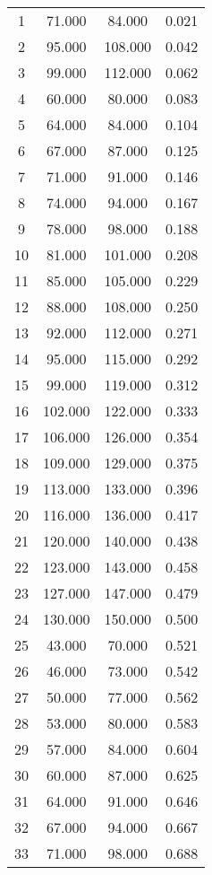 % 
\begin{tabular}{cccc}
  \hline
  \hline
1 & 71.000 & 84.000 & 0.021 \\ 
  2 & 95.000 & 108.000 & 0.042 \\ 
  3 & 99.000 & 112.000 & 0.062 \\ 
  4 & 60.000 & 80.000 & 0.083 \\ 
  5 & 64.000 & 84.000 & 0.104 \\ 
  6 & 67.000 & 87.000 & 0.125 \\ 
  7 & 71.000 & 91.000 & 0.146 \\ 
  8 & 74.000 & 94.000 & 0.167 \\ 
  9 & 78.000 & 98.000 & 0.188 \\ 
  10 & 81.000 & 101.000 & 0.208 \\ 
  11 & 85.000 & 105.000 & 0.229 \\ 
  12 & 88.000 & 108.000 & 0.250 \\ 
  13 & 92.000 & 112.000 & 0.271 \\ 
  14 & 95.000 & 115.000 & 0.292 \\ 
  15 & 99.000 & 119.000 & 0.312 \\ 
  16 & 102.000 & 122.000 & 0.333 \\ 
  17 & 106.000 & 126.000 & 0.354 \\ 
  18 & 109.000 & 129.000 & 0.375 \\ 
  19 & 113.000 & 133.000 & 0.396 \\ 
  20 & 116.000 & 136.000 & 0.417 \\ 
  21 & 120.000 & 140.000 & 0.438 \\ 
  22 & 123.000 & 143.000 & 0.458 \\ 
  23 & 127.000 & 147.000 & 0.479 \\ 
  24 & 130.000 & 150.000 & 0.500 \\ 
  25 & 43.000 & 70.000 & 0.521 \\ 
  26 & 46.000 & 73.000 & 0.542 \\ 
  27 & 50.000 & 77.000 & 0.562 \\ 
  28 & 53.000 & 80.000 & 0.583 \\ 
  29 & 57.000 & 84.000 & 0.604 \\ 
  30 & 60.000 & 87.000 & 0.625 \\ 
  31 & 64.000 & 91.000 & 0.646 \\ 
  32 & 67.000 & 94.000 & 0.667 \\ 
  33 & 71.000 & 98.000 & 0.688 \\ 

\end{tabular}
